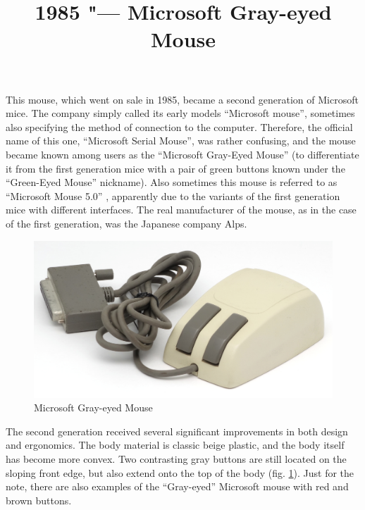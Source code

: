 \documentclass[11pt, a4paper]{article}
\begin{document}
\title{1985 "--- Microsoft Gray-eyed Mouse}
\date{}
\maketitle
{}

This mouse, which went on sale in 1985, became a second generation of Microsoft mice. The company simply called its early models ``Microsoft mouse'', sometimes also specifying the method of connection to the computer. Therefore, the official name of this one, ``Microsoft Serial Mouse'', was rather confusing, and the mouse became known among users as the ``Microsoft Gray-Eyed Mouse'' (to differentiate it from the first generation mice with a pair of green buttons known under the ``Green-Eyed Mouse'' nickname). Also sometimes this mouse is referred to as ``Microsoft Mouse 5.0'' \cite{mouses}, apparently due to the variants of the first generation mice with different interfaces.
The real manufacturer of the mouse, as in the case of the first generation, was the Japanese company Alps.

\begin{figure}[h]
   \centering
    \includegraphics[scale=0.55]{1985_microsoft_gray_eyed_mouse/pic_30.jpg}
    \caption{Microsoft Gray-eyed Mouse}
    \label{fig:MicrosoftGrayEyedPic}
\end{figure}

The second generation received several significant improvements in both design and ergonomics. The body material is classic beige plastic, and the body itself has become more convex. Two contrasting gray buttons are still located on the sloping front edge, but also extend onto the top of the body (fig. \ref{fig:MicrosoftGrayEyedPic}). Just for the note, there are also examples of the ``Gray-eyed'' Microsoft mouse with red and brown buttons.
\end{document}
